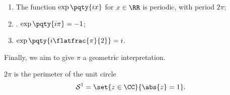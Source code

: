 \begin{corollary}
    \label{cor:properties-complex-exponentials}%
    \begin{enumerate}
        \item The function \(\exp \pqty{ix}\) for \(x \in \RR\) is periodic, with period \(2 \pi\);
        \item {}. \(\exp \pqty{i \pi} = -1\);
        \item \(\exp \pqty{i \flatfrac{\pi}{2}} = i\).
    \end{enumerate}
\end{corollary}

Finally, we aim to give \(\pi\) a geometric interpretation.

\begin{lemma}
    \label{lem:perimeter-unit-circle}%
    \(2\pi\) is the perimeter of the unit circle
    \[
        \mathcal{S}^1 = \set{z \in \CC}{\abs{z} = 1}.
    \]
\end{lemma}

